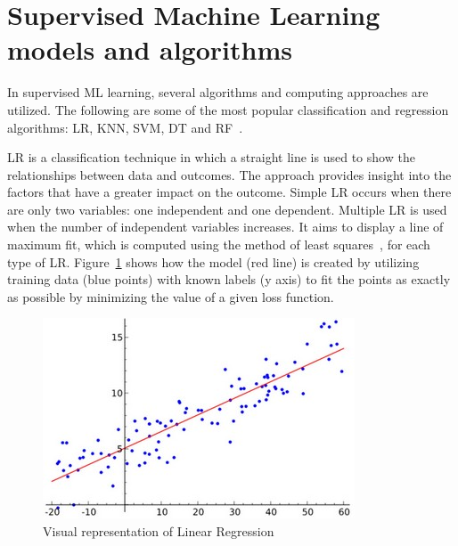 \section{Supervised Machine Learning models and algorithms}

In supervised \gls{ML} learning, several algorithms and computing approaches are utilized. The following are some of the most popular classification and regression algorithms: \gls{LR}, \gls{KNN}, \gls{SVM}, \gls{DT} and \gls{RF}~\cite{2020WhatIBM,Chugh2018TypesKnow}.

\gls{LR} is a classification technique in which a straight line is used to show the relationships between data and outcomes. The approach provides insight into the factors that have a greater impact on the outcome. Simple \gls{LR} occurs when there are only two variables: one independent and one dependent. Multiple \gls{LR} is used when the number of independent variables increases. It aims to display a line of maximum fit, which is computed using the method of least squares~\cite{Kenton2021LeastDefinition}, for each type of \gls{LR}. Figure~\ref{fig:linear_regression} shows how the model (red line) is created by utilizing training data (blue points) with known labels (y axis) to fit the points as exactly as possible by minimizing the value of a given loss function.

\begin{figure}[htbp]
    \centering
    \includegraphics[width=0.65\linewidth]{Chapters/Figures/linear_regression.jpg}
    \caption{Visual representation of Linear Regression~\cite{MachineRegressionModel}}
    \label{fig:linear_regression}
\end{figure}

